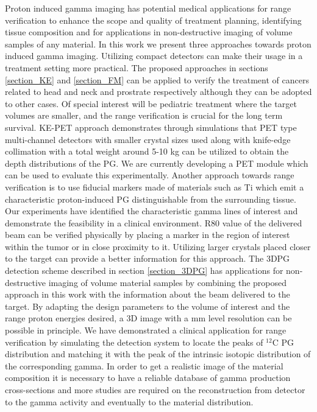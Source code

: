 \documentclass[11pt,a4paper]{article}
\begin{document}
Proton induced gamma imaging has potential medical applications for  range verification to enhance the scope and quality of treatment planning, identifying tissue composition and for applications in non-destructive imaging of volume samples of any material. In this work we present three approaches towards proton induced gamma imaging.
Utilizing compact detectors can make their usage in a treatment setting more practical. The proposed approaches in sections \ref{section_KE} and \ref{section_FM} can be  applied to verify the treatment of cancers related to head and neck and prostrate respectively although they can be adopted to other cases. Of special interest will be pediatric treatment where the target volumes are smaller, and the range verification is crucial for the long term survival. KE-PET approach demonstrates through simulations that PET type multi-channel detectors with smaller crystal sizes used along with knife-edge collimation with a total weight around 5-10 kg can be utilized to obtain the depth distributions of the PG. We are currently developing a PET module which can be used to evaluate this experimentally. Another approach towards range verification is to use fiducial markers made of materials such as Ti which emit a characteristic proton-induced PG distinguishable from the surrounding tissue. Our experiments have identified the characteristic gamma lines of interest and demonstrate the feasibility in a clinical environment. R80 value of the delivered beam can be verified physically by placing a marker in the region of interest within the tumor or in close proximity to it. Utilizing larger crystals placed closer to the target can provide a better information for this approach. The 3DPG detection scheme described in section \ref{section_3DPG}  has applications for non-destructive imaging of volume material samples by combining the proposed approach in this work with the information about the beam delivered to the target. By adapting the design  parameters to the volume of interest and the range proton energies desired, a 3D image with a mm level resolution can be  possible in principle. We have demonstrated a clinical application for range verification by simulating the detection system to locate the peaks of $\mathrm{^{12}C}$ PG distribution and matching it with the peak of the intrinsic isotopic distribution of the corresponding gamma.  In order to get a realistic image of the material composition it is necessary to have a reliable database of gamma production cross-sections and more studies are required on the reconstruction from detector to the gamma activity and eventually to the material distribution.
\end{document}
